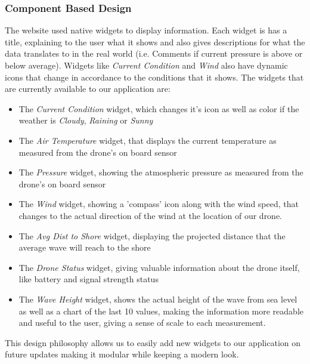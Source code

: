 \documentclass{article}
\begin{document}
    \subsubsection{Component Based Design}
    The website used native widgets to display information. Each widget is has a title, explaining to the user what it shows and also gives descriptions for what the data translates to in the real world (i.e. Comments if current pressure is above or below average). Widgets like \textit{Current Condition} and \textit{Wind} also have dynamic icons that change in accordance to the conditions that it shows. The widgets that are currently available to our application are:
    \begin{itemize}
        \item The \textit{Current Condition} widget, which changes it's icon as well as color if the weather is \textit{Cloudy}, \textit{Raining} or \textit{Sunny}
        \item The \textit{Air Temperature} widget, that displays the current temperature as measured from the drone's on board sensor
        \item The \textit{Pressure} widget, showing the atmospheric pressure as measured from the drone's on board sensor
        \item The \textit{Wind} widget, showing a 'compass' icon along with the wind speed, that changes to the actual direction of the wind at the location of our drone.
        \item The \textit{Avg Dist to Shore} widget, displaying the projected distance that the average wave will reach to the shore
        \item The \textit{Drone Status} widget, giving valuable information about the drone itself, like battery and signal strength status
        \item The \textit{Wave Height} widget, shows the actual height of the wave from sea level as well as a chart of the last 10 values, making the information more readable and useful to the user, giving a sense of scale to each measurement.
    \end{itemize}
    This design philosophy allows us to easily add new widgets to our application on future updates making it modular while keeping a modern look.
\end{document}

